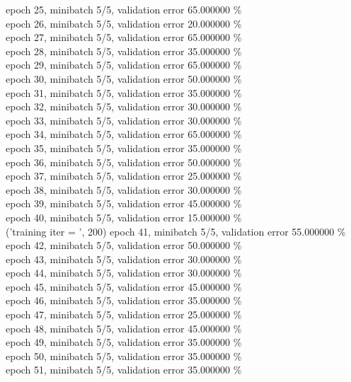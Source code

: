 \documentclass[a4paper]{article}
\begin{document}
epoch 25, minibatch 5/5, validation error 65.000000 \% \\
epoch 26, minibatch 5/5, validation error 20.000000 \% \\
epoch 27, minibatch 5/5, validation error 65.000000 \% \\
epoch 28, minibatch 5/5, validation error 35.000000 \% \\
epoch 29, minibatch 5/5, validation error 65.000000 \% \\
epoch 30, minibatch 5/5, validation error 50.000000 \% \\
epoch 31, minibatch 5/5, validation error 35.000000 \% \\
epoch 32, minibatch 5/5, validation error 30.000000 \% \\
epoch 33, minibatch 5/5, validation error 30.000000 \% \\
epoch 34, minibatch 5/5, validation error 65.000000 \% \\
epoch 35, minibatch 5/5, validation error 35.000000 \% \\
epoch 36, minibatch 5/5, validation error 50.000000 \% \\
epoch 37, minibatch 5/5, validation error 25.000000 \% \\
epoch 38, minibatch 5/5, validation error 30.000000 \% \\
epoch 39, minibatch 5/5, validation error 45.000000 \% \\
epoch 40, minibatch 5/5, validation error 15.000000 \% \\
('training \@ iter = ', 200)
epoch 41, minibatch 5/5, validation error 55.000000 \% \\
epoch 42, minibatch 5/5, validation error 50.000000 \% \\
epoch 43, minibatch 5/5, validation error 30.000000 \% \\
epoch 44, minibatch 5/5, validation error 30.000000 \% \\
epoch 45, minibatch 5/5, validation error 45.000000 \% \\
epoch 46, minibatch 5/5, validation error 35.000000 \% \\
epoch 47, minibatch 5/5, validation error 25.000000 \% \\
epoch 48, minibatch 5/5, validation error 45.000000 \% \\
epoch 49, minibatch 5/5, validation error 35.000000 \% \\
epoch 50, minibatch 5/5, validation error 35.000000 \% \\
epoch 51, minibatch 5/5, validation error 35.000000 \% \\
\end{document}
